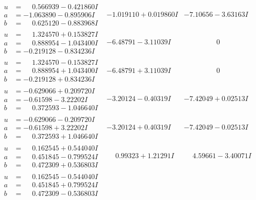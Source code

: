 \documentclass[1p]{elsarticle_modified}
\theoremstyle{definition}
\begin{document}
$$\begin{array}{c|c|c}
\begin{aligned}
u &= \phantom{-}0.566939 - 0.421860 I \\
a &= -1.063890 - 0.895906 I \\
b &= \phantom{-}0.625120 - 0.883968 I\end{aligned}
 & -1.019110 + 0.019860 I & -7.10656 - 3.63163 I \\ \hline\begin{aligned}
u &= \phantom{-}1.324570 + 0.153827 I \\
a &= \phantom{-}0.888954 - 1.043400 I \\
b &= -0.219128 - 0.834236 I\end{aligned}
 & -6.48791 - 3.11039 I & \phantom{-0.000000 } 0 \\ \hline\begin{aligned}
u &= \phantom{-}1.324570 - 0.153827 I \\
a &= \phantom{-}0.888954 + 1.043400 I \\
b &= -0.219128 + 0.834236 I\end{aligned}
 & -6.48791 + 3.11039 I & \phantom{-0.000000 } 0 \\ \hline\begin{aligned}
u &= -0.629066 + 0.209720 I \\
a &= -0.61598 - 3.22202 I \\
b &= \phantom{-}0.372593 - 1.046640 I\end{aligned}
 & -3.20124 - 0.40319 I & -7.42049 + 0.02513 I \\ \hline\begin{aligned}
u &= -0.629066 - 0.209720 I \\
a &= -0.61598 + 3.22202 I \\
b &= \phantom{-}0.372593 + 1.046640 I\end{aligned}
 & -3.20124 + 0.40319 I & -7.42049 - 0.02513 I \\ \hline\begin{aligned}
u &= \phantom{-}0.162545 + 0.544040 I \\
a &= \phantom{-}0.451845 - 0.799524 I \\
b &= \phantom{-}0.472309 + 0.536803 I\end{aligned}
 & \phantom{-}0.99323 + 1.21291 I & \phantom{-}4.59661 - 3.40071 I \\ \hline\begin{aligned}
u &= \phantom{-}0.162545 - 0.544040 I \\
a &= \phantom{-}0.451845 + 0.799524 I \\
b &= \phantom{-}0.472309 - 0.536803 I\end{aligned}

\end{array}$$
\end{document}
